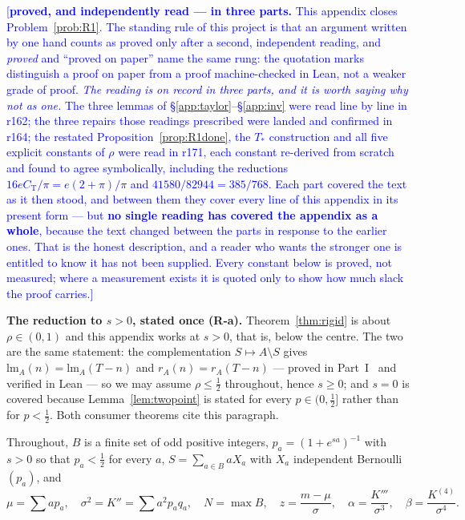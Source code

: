 \documentclass[11pt,a4paper]{article}
\theoremstyle{plain}
\theoremstyle{definition}
\theoremstyle{remark}
\newcommand{\STATUS}[1]{\textcolor{blue}{\textsf{[#1]}}}
\begin{document}
\STATUS{\textbf{proved, and independently read --- in three parts.} This appendix closes
Problem~\ref{prob:R1}. The standing rule of this project is that an argument written by one hand
counts as proved only after a second, independent reading, and \emph{proved} and ``proved on
paper'' name the same rung: the quotation marks distinguish a proof on paper from a proof
machine-checked in Lean, not a weaker grade of proof. \emph{The reading is on record in three parts, and it is worth saying why not as one.} The
three lemmas of \S\ref{app:taylor}--\S\ref{app:inv} were read line by line in r162; the three
repairs those readings prescribed were landed and confirmed in r164; the restated
Proposition~\ref{prop:R1done}, the $T_{*}$ construction and all five explicit constants of
$\rho$ were read in r171, each constant re-derived from scratch and found to agree symbolically,
including the reductions $16eC_{\mathrm{T}}/\pi=e(2+\pi)/\pi$ and $41580/82944=385/768$. Each
part covered the text as it then stood, and between them they cover every line of this appendix
in its present form --- but \textbf{no single reading has covered the appendix as a whole},
because the text changed between the parts in response to the earlier ones. That is the honest
description, and a reader who wants the stronger one is entitled to know it has not been
supplied. Every constant below is proved, not measured; where a measurement exists it is quoted only to
show how much slack the proof carries.}

\medskip
\noindent
\textbf{The reduction to $s>0$, stated once (R-a).} Theorem~\ref{thm:rigid} is about
$\rho\in(0,1)$ and this appendix works at $s>0$, that is, below the centre. The two are the
same statement: the complementation $S\mapsto A\setminus S$ gives
$\mathrm{lm}_A(n)=\mathrm{lm}_A(T-n)$ and $r_A(n)=r_A(T-n)$ --- proved in Part~I~\cite{P1} and
verified in Lean --- so we may assume $\rho\le\tfrac12$ throughout, hence $s\ge0$; and
$s=0$ is covered because Lemma~\ref{lem:twopoint} is stated for every $p\in(0,\tfrac12]$
rather than for $p<\tfrac12$. Both consumer theorems cite this paragraph.

Throughout, $B$ is a finite set of odd positive integers, $p_a=(1+e^{sa})^{-1}$ with $s>0$ so
that $p_a<\tfrac12$ for every $a$, $S=\sum_{a\in B}aX_a$ with $X_a$ independent
Bernoulli$(p_a)$, and
\[
  \mu=\sum a p_a,\quad \sigma^{2}=K''=\sum a^{2}p_aq_a,\quad
  N=\max B,\quad z=\frac{m-\mu}{\sigma},\quad
  \alpha=\frac{K'''}{\sigma^{3}},\quad \beta=\frac{K^{(4)}}{\sigma^{4}} .
\]
\end{document}
